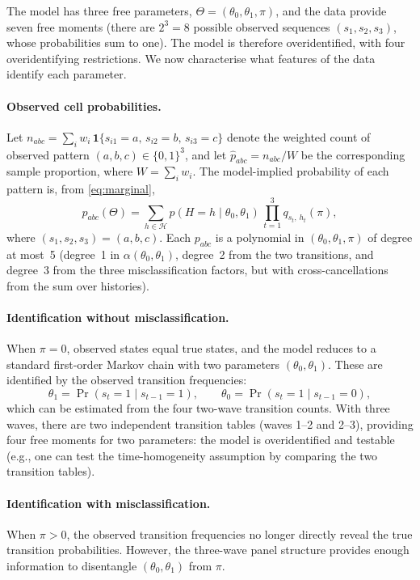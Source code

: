 \documentclass[12pt]{article}
\begin{document}
The model has three free parameters,
\(\Theta = (\theta_0, \theta_1, \pi)\), and the data provide seven
free moments (there are \(2^3 = 8\) possible observed sequences
\((s_1, s_2, s_3)\), whose probabilities sum to one). The model is
therefore overidentified, with four overidentifying restrictions.
We now characterise what features of the data identify each parameter.

\paragraph{Observed cell probabilities.}
Let \(n_{abc} = \sum_{i} w_i\, \mathbf{1}\{s_{i1} = a,\, s_{i2} = b,\,
s_{i3} = c\}\) denote the weighted count of observed pattern
\((a, b, c) \in \{0,1\}^3\), and let
\(\hat{p}_{abc} = n_{abc} / W\) be the corresponding sample proportion,
where \(W = \sum_i w_i\). The model-implied probability of each pattern
is, from \eqref{eq:marginal},
\begin{equation}
p_{abc}(\Theta) = \sum_{h \in \mathcal{H}}
  p(H = h \mid \theta_0, \theta_1)\,
  \prod_{t=1}^{3} q_{s_t,\, h_t}(\pi),
\label{eq:cell_prob}
\end{equation}
where \((s_1, s_2, s_3) = (a, b, c)\). Each \(p_{abc}\) is a polynomial
in \((\theta_0, \theta_1, \pi)\) of degree at most~5 (degree~1 in
\(\alpha(\theta_0, \theta_1)\), degree~2 from the two transitions, and
degree~3 from the three misclassification factors, but with
cross-cancellations from the sum over histories).

\paragraph{Identification without misclassification.}
When \(\pi = 0\), observed states equal true states, and the model
reduces to a standard first-order Markov chain with two parameters
\((\theta_0, \theta_1)\). These are identified by the observed
transition frequencies:
\[
\theta_1 = \Pr(s_t = 1 \mid s_{t-1} = 1), \qquad
\theta_0 = \Pr(s_t = 1 \mid s_{t-1} = 0),
\]
which can be estimated from the four two-wave transition counts. With
three waves, there are two independent transition tables (waves 1--2 and
2--3), providing four free moments for two parameters: the model is
overidentified and testable (e.g., one can test the time-homogeneity
assumption by comparing the two transition tables).

\paragraph{Identification with misclassification.}
When \(\pi > 0\), the observed transition frequencies no longer directly
reveal the true transition probabilities. However, the three-wave panel
structure provides enough information to disentangle
\((\theta_0, \theta_1)\) from \(\pi\).
\end{document}
